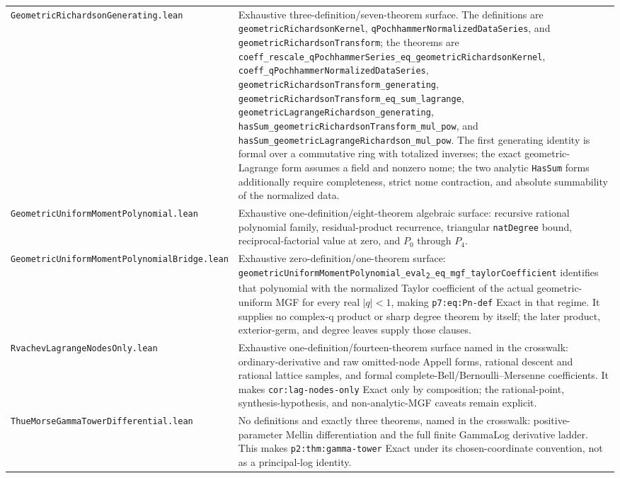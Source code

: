 \documentclass[11pt,oneside]{article}
\theoremstyle{definition}
\theoremstyle{remark}
\newcommand{\leansubtwo}[2]{%
  \nolinkurl{#1}\texttt{\textsubscript{2}}\nolinkurl{#2}}
\begin{document}
\begin{longtable}{>{\raggedright\arraybackslash}p{} >{\raggedright\arraybackslash}p{}}
\nolinkurl{GeometricRichardsonGenerating.lean} & Exhaustive three-definition/seven-theorem surface.  The definitions are \nolinkurl{geometricRichardsonKernel}, \nolinkurl{qPochhammerNormalizedDataSeries}, and \nolinkurl{geometricRichardsonTransform}; the theorems are \nolinkurl{coeff_rescale_qPochhammerSeries_eq_geometricRichardsonKernel}, \nolinkurl{coeff_qPochhammerNormalizedDataSeries}, \nolinkurl{geometricRichardsonTransform_generating}, \nolinkurl{geometricRichardsonTransform_eq_sum_lagrange}, \nolinkurl{geometricLagrangeRichardson_generating}, \nolinkurl{hasSum_geometricRichardsonTransform_mul_pow}, and \nolinkurl{hasSum_geometricLagrangeRichardson_mul_pow}.  The first generating identity is formal over a commutative ring with totalized inverses; the exact geometric-Lagrange form assumes a field and nonzero nome; the two analytic \nolinkurl{HasSum} forms additionally require completeness, strict nome contraction, and absolute summability of the normalized data. \\
\nolinkurl{GeometricUniformMomentPolynomial.lean} & Exhaustive one-definition/eight-theorem algebraic surface: recursive rational polynomial family, residual-product recurrence, triangular \nolinkurl{natDegree} bound, reciprocal-factorial value at zero, and \(P_0\) through \(P_4\). \\
\nolinkurl{GeometricUniformMomentPolynomialBridge.lean} & Exhaustive zero-definition/one-theorem surface: \leansubtwo{geometricUniformMomentPolynomial_eval}{_eq_mgf_taylorCoefficient} identifies that polynomial with the normalized Taylor coefficient of the actual geometric-uniform MGF for every real \(\lvert q\rvert<1\), making \nolinkurl{p7:eq:Pn-def} Exact in that regime.  It supplies no complex-q product or sharp degree theorem by itself; the later product, exterior-germ, and degree leaves supply those clauses. \\
\nolinkurl{RvachevLagrangeNodesOnly.lean} & Exhaustive one-definition/fourteen-theorem surface named in the crosswalk: ordinary-derivative and raw omitted-node Appell forms, rational descent and rational lattice samples, and formal complete-Bell/Bernoulli--Mersenne coefficients.  It makes \nolinkurl{cor:lag-nodes-only} Exact only by composition; the rational-point, synthesis-hypothesis, and non-analytic-MGF caveats remain explicit. \\
\nolinkurl{ThueMorseGammaTowerDifferential.lean} & No definitions and exactly three theorems, named in the crosswalk: positive-parameter Mellin differentiation and the full finite GammaLog derivative ladder.  This makes \nolinkurl{p2:thm:gamma-tower} Exact under its chosen-coordinate convention, not as a principal-log identity. \\

\end{longtable}
\end{document}
